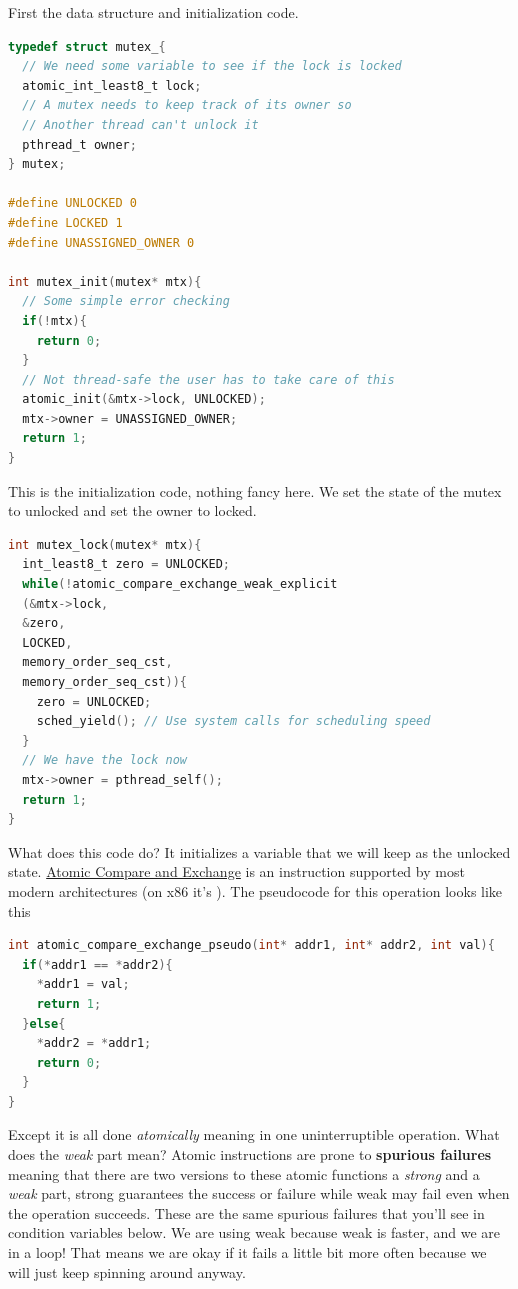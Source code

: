 First the data structure and initialization code.

\begin{lstlisting}[language=C]
typedef struct mutex_{
  // We need some variable to see if the lock is locked
  atomic_int_least8_t lock;
  // A mutex needs to keep track of its owner so
  // Another thread can't unlock it
  pthread_t owner;
} mutex;

#define UNLOCKED 0
#define LOCKED 1
#define UNASSIGNED_OWNER 0

int mutex_init(mutex* mtx){
  // Some simple error checking
  if(!mtx){
    return 0;
  }
  // Not thread-safe the user has to take care of this
  atomic_init(&mtx->lock, UNLOCKED);
  mtx->owner = UNASSIGNED_OWNER;
  return 1;
}
\end{lstlisting}

This is the initialization code, nothing fancy here.
We set the state of the mutex to unlocked and set the owner to locked.

\begin{lstlisting}[language=C]
int mutex_lock(mutex* mtx){
  int_least8_t zero = UNLOCKED;
  while(!atomic_compare_exchange_weak_explicit
  (&mtx->lock,
  &zero,
  LOCKED,
  memory_order_seq_cst,
  memory_order_seq_cst)){
    zero = UNLOCKED;
    sched_yield(); // Use system calls for scheduling speed
  }
  // We have the lock now
  mtx->owner = pthread_self();
  return 1;
}
\end{lstlisting}

What does this code do?
It initializes a variable that we will keep as the unlocked state.
\href{https://en.wikipedia.org/wiki/Compare-and-swap}{Atomic Compare and Exchange} is an instruction supported by most modern architectures (on x86 it's ).
The pseudocode for this operation looks like this

\begin{lstlisting}[language=C]
int atomic_compare_exchange_pseudo(int* addr1, int* addr2, int val){
  if(*addr1 == *addr2){
    *addr1 = val;
    return 1;
  }else{
    *addr2 = *addr1;
    return 0;
  }
}
\end{lstlisting}

Except it is all done \emph{atomically} meaning in one uninterruptible operation.
What does the \emph{weak} part mean?
Atomic instructions are prone to \textbf{spurious failures} meaning that there are two versions to these atomic functions a \emph{strong} and a \emph{weak} part, strong guarantees the success or failure while weak may fail even when the operation succeeds.
These are the same spurious failures that you'll see in condition variables below.
We are using weak because weak is faster, and we are in a loop!
That means we are okay if it fails a little bit more often because we will just keep spinning around anyway.

